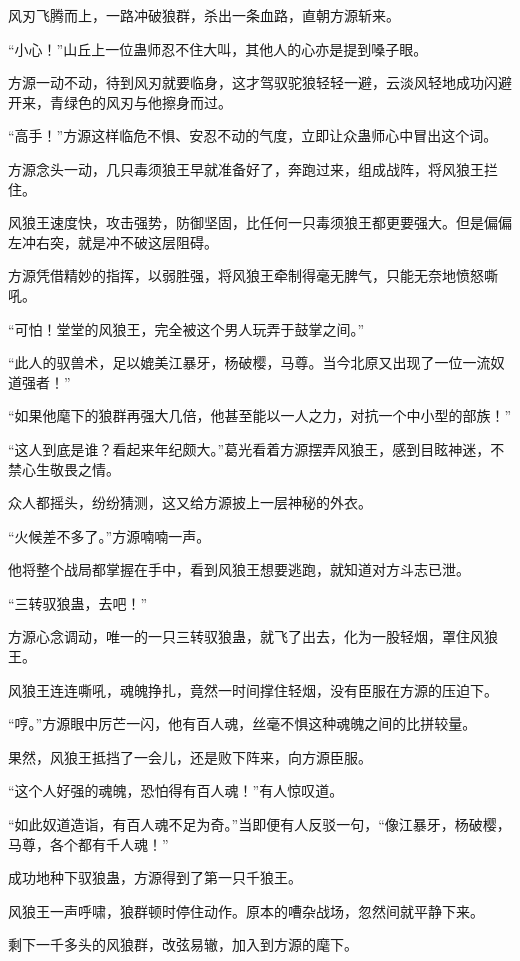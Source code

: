\begin{this_body}
风刃飞腾而上，一路冲破狼群，杀出一条血路，直朝方源斩来。

“小心！”山丘上一位蛊师忍不住大叫，其他人的心亦是提到嗓子眼。

方源一动不动，待到风刃就要临身，这才驾驭驼狼轻轻一避，云淡风轻地成功闪避开来，青绿色的风刃与他擦身而过。

“高手！”方源这样临危不惧、安忍不动的气度，立即让众蛊师心中冒出这个词。

方源念头一动，几只毒须狼王早就准备好了，奔跑过来，组成战阵，将风狼王拦住。

风狼王速度快，攻击强势，防御坚固，比任何一只毒须狼王都更要强大。但是偏偏左冲右突，就是冲不破这层阻碍。

方源凭借精妙的指挥，以弱胜强，将风狼王牵制得毫无脾气，只能无奈地愤怒嘶吼。

“可怕！堂堂的风狼王，完全被这个男人玩弄于鼓掌之间。”

“此人的驭兽术，足以媲美江暴牙，杨破樱，马尊。当今北原又出现了一位一流奴道强者！”

“如果他麾下的狼群再强大几倍，他甚至能以一人之力，对抗一个中小型的部族！”

“这人到底是谁？看起来年纪颇大。”葛光看着方源摆弄风狼王，感到目眩神迷，不禁心生敬畏之情。

众人都摇头，纷纷猜测，这又给方源披上一层神秘的外衣。

“火候差不多了。”方源喃喃一声。

他将整个战局都掌握在手中，看到风狼王想要逃跑，就知道对方斗志已泄。

“三转驭狼蛊，去吧！”

方源心念调动，唯一的一只三转驭狼蛊，就飞了出去，化为一股轻烟，罩住风狼王。

风狼王连连嘶吼，魂魄挣扎，竟然一时间撑住轻烟，没有臣服在方源的压迫下。

“哼。”方源眼中厉芒一闪，他有百人魂，丝毫不惧这种魂魄之间的比拼较量。

果然，风狼王抵挡了一会儿，还是败下阵来，向方源臣服。

“这个人好强的魂魄，恐怕得有百人魂！”有人惊叹道。

“如此奴道造诣，有百人魂不足为奇。”当即便有人反驳一句，“像江暴牙，杨破樱，马尊，各个都有千人魂！”

成功地种下驭狼蛊，方源得到了第一只千狼王。

风狼王一声呼啸，狼群顿时停住动作。原本的嘈杂战场，忽然间就平静下来。

剩下一千多头的风狼群，改弦易辙，加入到方源的麾下。


\end{this_body}
